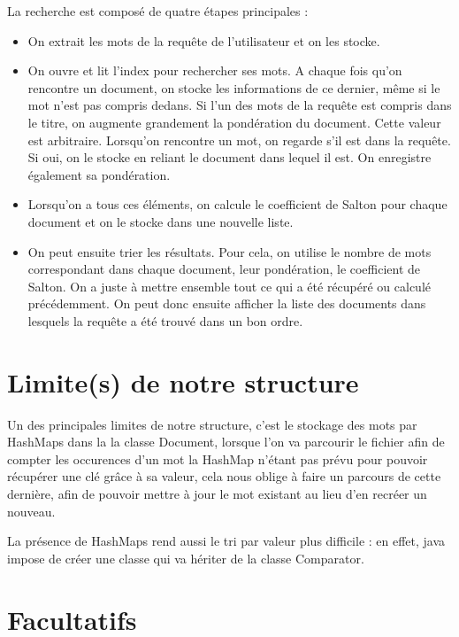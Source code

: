 \documentclass{article}
\begin{document}
La recherche est composé de quatre étapes principales :
\begin{itemize}
     \item On extrait les mots de la requête de l'utilisateur et on les stocke.
     \item On ouvre et lit l'index pour rechercher ses mots. A chaque fois qu'on rencontre un document, on stocke les informations de ce dernier, même si le mot n'est pas compris dedans.
	  Si l'un des mots de la requête est compris dans le titre, on augmente grandement la pondération du document. Cette valeur est arbitraire.
	  Lorsqu'on rencontre un mot, on regarde s'il est dans la requête. Si oui, on le stocke en reliant le document dans lequel il est. On enregistre également sa pondération.
     \item Lorsqu'on a tous ces éléments, on calcule le coefficient de Salton pour chaque document et on le stocke dans une nouvelle liste.
     \item On peut ensuite trier les résultats. Pour cela, on utilise le nombre de mots correspondant dans chaque document, leur pondération, le coefficient de Salton. 
	  On a juste à mettre ensemble tout ce qui a été récupéré ou calculé précédemment. On peut donc ensuite afficher la liste des documents dans lesquels la requête a été trouvé dans un bon ordre.
\end{itemize}



\section{Limite(s) de notre structure}

Un des principales limites de notre structure, c'est le stockage des mots par HashMaps dans la
la classe Document, lorsque l'on va parcourir le fichier afin de compter les occurences d'un
mot la HashMap n'étant pas prévu pour pouvoir récupérer une clé grâce à sa valeur, cela nous
oblige à faire un parcours de cette dernière, afin de pouvoir mettre à jour le mot existant
au lieu d'en recréer un nouveau.

La présence de HashMaps rend aussi le tri par valeur plus difficile : en effet, java impose de créer 
une classe qui va hériter de la classe Comparator.



\section{Facultatifs}
\end{document}
